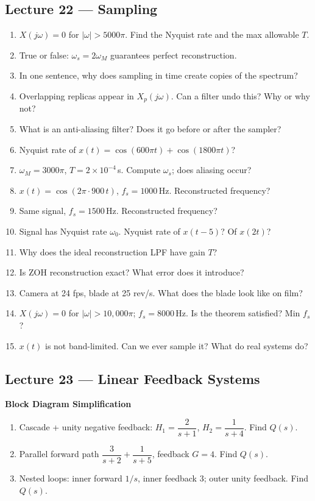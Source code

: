 \documentclass[11pt]{article}
\begin{document}
\subsection{Lecture 22 --- Sampling}
\begin{enumerate}
  \item $X(j\omega) = 0$ for $|\omega| > 5000\pi$. Find the Nyquist rate and the max allowable $T$.
  \item True or false: $\omega_s = 2\omega_M$ guarantees perfect reconstruction.
  \item In one sentence, why does sampling in time create copies of the spectrum?
  \item Overlapping replicas appear in $X_p(j\omega)$. Can a filter undo this? Why or why not?
  \item What is an anti-aliasing filter? Does it go before or after the sampler?
  \item Nyquist rate of $x(t) = \cos(600\pi t) + \cos(1800\pi t)$?
  \item $\omega_M = 3000\pi$, $T = 2 \times 10^{-4}$\,s. Compute $\omega_s$; does aliasing occur?
  \item $x(t) = \cos(2\pi \cdot 900\,t)$, $f_s = 1000$\,Hz. Reconstructed frequency?
  \item Same signal, $f_s = 1500$\,Hz. Reconstructed frequency?
  \item Signal has Nyquist rate $\omega_0$. Nyquist rate of $x(t - 5)$? Of $x(2t)$?
  \item Why does the ideal reconstruction LPF have gain $T$?
  \item Is ZOH reconstruction exact? What error does it introduce?
  \item Camera at 24 fps, blade at 25 rev/s. What does the blade look like on film?
  \item $X(j\omega) = 0$ for $|\omega| > 10{,}000\pi$; $f_s = 8000$\,Hz. Is the theorem satisfied? Min $f_s$?
  \item $x(t)$ is not band-limited. Can we ever sample it? What do real systems do?
\end{enumerate}

\subsection{Lecture 23 --- Linear Feedback Systems}

\textbf{Block Diagram Simplification}
\begin{enumerate}
  \item Cascade + unity negative feedback: $H_1 = \dfrac{2}{s+1}$, $H_2 = \dfrac{1}{s+4}$. Find $Q(s)$.
  \item Parallel forward path $\dfrac{3}{s+2} + \dfrac{1}{s+5}$, feedback $G = 4$. Find $Q(s)$.
  \item Nested loops: inner forward $1/s$, inner feedback $3$; outer unity feedback. Find $Q(s)$.
\end{enumerate}
\end{document}
